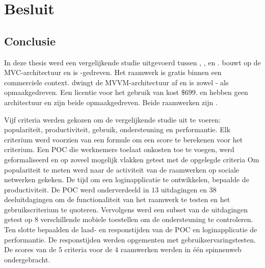 \chapter{Besluit}
\label{chap:besluit}

\section{Conclusie} %


In deze thesis werd een vergelijkende studie uitgevoerd tussen \st{}, \kendo{},  \jqm{} en \lungo{}.
\st{} bouwt op de MVC-architectuur en is \js-gedreven.
Het raamwerk is gratis binnen een commerciele context.
\kendo{} dwingt de MVVM-architectuur af en is zowel \js- als opmaakgedreven.
Een licentie voor het gebruik van \kendo{} kost $\$699$.
\jqm{} en \lungo{} hebben geen architectuur en zijn beide opmaakgedreven.
Beide raamwerken zijn .

Vijf criteria werden gekozen om de vergelijkende studie uit te voeren:  populariteit,  productiviteit,  gebruik,  ondersteuning en performantie.
Elk criterium werd voorzien van een formule om een score te berekenen voor het criterium.
Een POC die werknemers toelaat onkosten toe te voegen, werd geformaliseerd en op zoveel mogelijk vlakken getest met de opgelegde criteria
Om populariteit te meten werd naar de activiteit van de raamwerken op sociale netwerken gekeken.
De tijd om een loginapplicatie te ontwikkelen, bepaalde de productiviteit.
De POC werd onderverdeeld in $13$ uitdagingen en $38$ deeluitdagingen om de functionaliteit van het raamwerk te testen en het gebruikscriterium te quoteren.
Vervolgens werd een subset van de uitdagingen getest op $8$ verschillende mobiele toestellen om de ondersteuning te controleren.
Ten slotte bepaalden de laad- en responstijden van de POC en loginapplicatie de performantie.
De responstijden werden opgementen met gebruikservaringstesten.
De scores van de $5$ criteria voor de $4$ raamwerken werden in één spinnenweb ondergebracht.

